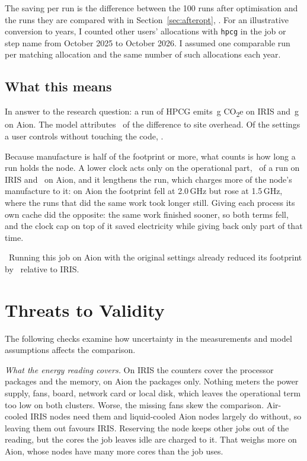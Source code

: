 \documentclass[conference,a4paper]{IEEEtran}
\begin{document}
The saving per run is the difference between the 100 runs after optimisation and
the runs they are compared with in Section~\ref{sec:afteropt}, \OptSaveText.
For an illustrative conversion to years, I counted other users' allocations
with \texttt{hpcg} in the job or step name from October 2025 to October 2026.
I assumed one comparable run per matching allocation and the same number of
such allocations each year.
\PaybackText

\subsection{What this means}\label{sec:whatmeans}

In answer to the research question: a run of HPCG emits \IrisGrams\,g
CO\textsubscript{2}e on IRIS and \AionGrams\,g on Aion. The model attributes
\GapShareSite\ of the difference to site overhead. Of the
settings a user controls without touching the code, \OptBestText.

Because manufacture is half of the footprint or more, what counts is how long a
run holds the node. A lower clock acts only on the operational part,
\IrisShareOp\ of a run on IRIS and \AionShareOp\ on Aion, and it lengthens the
run, which charges more of the node's manufacture to it: on Aion the footprint
fell at 2.0\,GHz but rose at 1.5\,GHz, where the runs that did the same work took
longer still. Giving each process its own cache did the opposite: the same work
finished sooner, so both terms fell, and the clock cap on top of it saved
electricity while giving back only part of that time.

\PaybackMeaningText\ Running this job on Aion with the original settings
already reduced its footprint by \AionSave\ relative to IRIS.

\section{Threats to Validity}\label{sec:threats}

The following checks examine how uncertainty in the measurements and model
assumptions affects the comparison.

\emph{What the energy reading covers.} On IRIS the counters cover the processor
packages and the memory, on Aion the packages only. Nothing meters the power
supply, fans, board, network card or local disk, which leaves the operational
term too low on both clusters. Worse, the missing fans skew the comparison.
Air-cooled IRIS nodes need them and liquid-cooled Aion nodes largely do without,
so leaving them out favours IRIS. Reserving the node keeps other jobs out of the reading, but the cores the
job leaves idle are charged to it. That weighs more on Aion, whose nodes have
many more cores than the job uses.
\end{document}
